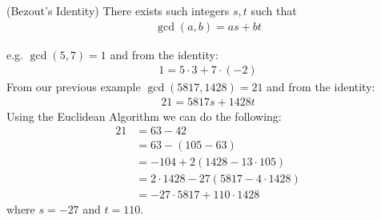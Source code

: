 \documentclass[../main.tex]{subfiles}
\begin{document}
\begin{theorem}
    (Bezout's Identity) There exists such integers $s, t$ such that
    \begin{align*}
        \gcd(a, b) = as + bt
    \end{align*}
\end{theorem}
e.g. $\gcd(5,7) = 1$ and from the identity:
\begin{align*}
    1 = 5 \cdot 3 + 7 \cdot (-2)
\end{align*}
From our previous example $\gcd(5817, 1428) = 21$ and from the identity:
\begin{align*}
    21 = 5817 s + 1428 t
\end{align*}
Using the Euclidean Algorithm we can do the following:
\begin{align*}
    21 &= 63 - 42 \\
       &= 63 - (105 - 63) \\
       &= -104 + 2(1428 - 13 \cdot 105) \\
       &= 2 \cdot 1428 - 27 (5817 - 4 \cdot 1428) \\
       &= -27 \cdot 5817 + 110 \cdot 1428
\end{align*}
where $s = -27$ and $t = 110$.
\end{document}
